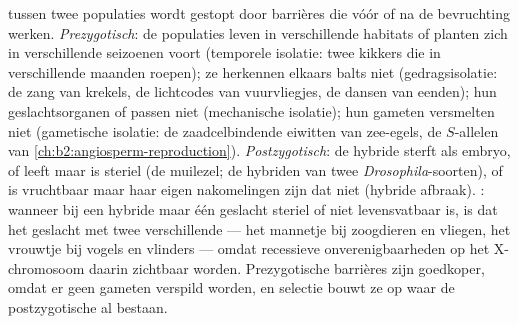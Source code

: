 \begin{proposition}[Isolatiemechanismen]\label{prop:b2:speciation:isolation}
 tussen twee populaties wordt gestopt door barrières die vóór of na
de bevruchting werken. \emph{Prezygotisch}: de populaties leven in
verschillende habitats of planten zich in verschillende seizoenen voort
(temporele isolatie: twee kikkers die in verschillende maanden roepen); ze
herkennen elkaars balts niet (gedragsisolatie: de zang van krekels, de
lichtcodes van vuurvliegjes, de dansen van eenden); hun geslachtsorganen of
 passen niet (mechanische isolatie); hun gameten versmelten niet
(gametische isolatie: de zaadcelbindende eiwitten van zee-egels, de
$S$-allelen van \cref{ch:b2:angiosperm-reproduction}).
\emph{Postzygotisch}: de hybride sterft als embryo, of leeft maar is
steriel (de muilezel; de hybriden van twee \emph{Drosophila}-soorten), of
is vruchtbaar maar haar eigen nakomelingen zijn dat niet (hybride afbraak).
\emph{}: wanneer bij een hybride maar één geslacht steriel
of niet levensvatbaar is, is dat het geslacht met twee verschillende
 --- het mannetje bij zoogdieren en vliegen, het vrouwtje
bij vogels en vlinders --- omdat recessieve onverenigbaarheden op het
X-chromosoom daarin zichtbaar worden. Prezygotische barrières zijn goedkoper,
omdat er geen gameten verspild worden, en selectie bouwt ze op waar de
postzygotische al bestaan.
\end{proposition}

